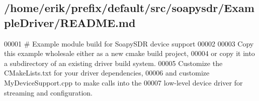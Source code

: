 \subsection{/home/erik/prefix/default/src/soapysdr/\+Example\+Driver/\+R\+E\+A\+D\+ME.md}

\begin{DoxyCode}
00001 # Example module build for SoapySDR device support
00002 
00003 Copy this example wholesale either as a new cmake build project,
00004 or copy it into a subdirectory of an existing driver build system.
00005 Customize the CMakeLists.txt for your driver dependencies,
00006 and customize MyDeviceSupport.cpp to make calls into the
00007 low-level device driver for streaming and configuration.
\end{DoxyCode}
